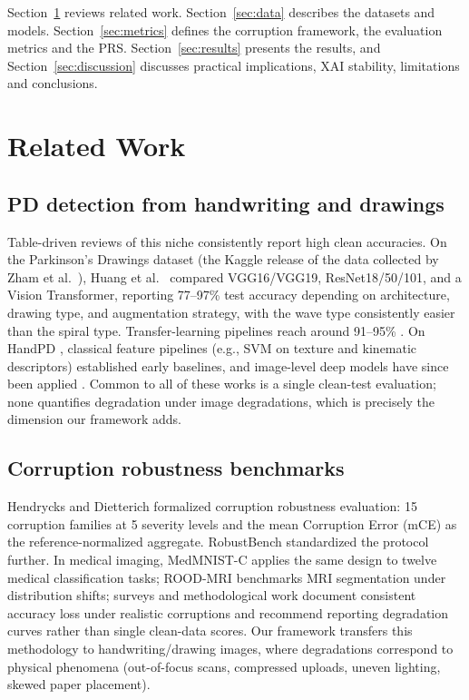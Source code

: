 \documentclass[11pt,a4paper]{article}
\begin{document}
Section~\ref{sec:related} reviews related work. Section~\ref{sec:data} describes the datasets and models. Section~\ref{sec:metrics} defines the corruption framework, the evaluation metrics and the PRS. Section~\ref{sec:results} presents the results, and Section~\ref{sec:discussion} discusses practical implications, XAI stability, limitations and conclusions.

\section{Related Work}
\label{sec:related}

\subsection{PD detection from handwriting and drawings}
Table-driven reviews of this niche consistently report high clean accuracies.
On the Parkinson's Drawings dataset (the Kaggle release of the data collected
by Zham et al.\ \cite{zham2016,zham2017}), Huang et al.\
\cite{huang2024} compared VGG16/VGG19, ResNet18/50/101, and a Vision
Transformer, reporting 77--97\% test accuracy depending on architecture,
drawing type, and augmentation strategy, with the wave type consistently
easier than the spiral type. Transfer-learning pipelines reach around
91--95\% \cite{frontiers2024,aims2024,diagnostics2025}. On HandPD
\cite{pereira2016}, classical feature pipelines (e.g., SVM on texture and
kinematic descriptors) established early baselines, and image-level deep
models have since been applied \cite{ml4h2021}. Common to all of these works
is a single clean-test evaluation; none quantifies degradation under image
degradations, which is precisely the dimension our framework adds.

\subsection{Corruption robustness benchmarks}
Hendrycks and Dietterich \cite{hendrycks2019} formalized corruption
robustness evaluation: 15 corruption families at 5 severity levels and the
mean Corruption Error (mCE) as the reference-normalized aggregate.
RobustBench \cite{croce2021} standardized the protocol further. In medical
imaging, MedMNIST-C \cite{medmnistc} applies the same design to twelve
medical classification tasks; ROOD-MRI \cite{boone2023} benchmarks MRI
segmentation under distribution shifts; surveys \cite{javed2024} and
methodological work \cite{shen2025} document consistent accuracy loss under
realistic corruptions and recommend reporting degradation curves rather than
single clean-data scores. Our framework transfers this methodology to
handwriting/drawing images, where degradations correspond to physical
phenomena (out-of-focus scans, compressed uploads, uneven lighting, skewed
paper placement).
\end{document}
